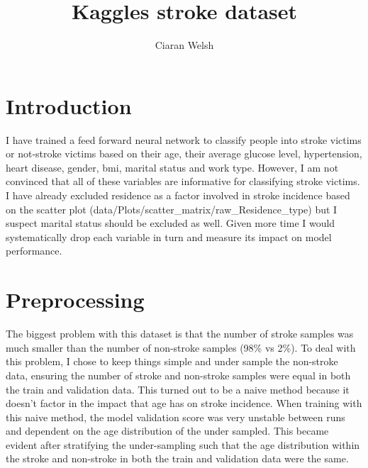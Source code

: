 \documentclass[12pt]{article}
\title{Kaggles stroke dataset}
\author{Ciaran Welsh}
\begin{document}
    \maketitle

    \section{Introduction}
    I have trained a feed forward neural network to classify people into stroke victims or not-stroke victims
    based on their age, their average glucose level, hypertension, heart disease, gender, bmi, marital status and
    work type. However, I am not convinced that all of these variables are informative for classifying stroke victims.
    I have already excluded residence as a factor involved in stroke incidence based on the scatter plot (data/Plots/scatter_matrix/raw_Residence_type)
    but I suspect marital status should be excluded as well. Given more time I would systematically drop each variable
    in turn and measure its impact on model performance.

    \section{Preprocessing}
    The biggest problem with this dataset is that the number of stroke samples was much smaller than the number
    of non-stroke samples (98\% vs 2\%). To deal with this problem, I chose to keep things simple and under sample the non-stroke
    data, ensuring the number of stroke and non-stroke samples were equal in both the train and validation data. This turned
    out to be a naive method because it doesn't factor in the impact that age has on stroke incidence. When training
    with this naive method, the model validation score was very unstable between runs and dependent on the
    age distribution of the under sampled. This became evident after stratifying the under-sampling such that the age distribution
    within the stroke and non-stroke in both the train and validation data were the same.
\end{document}
